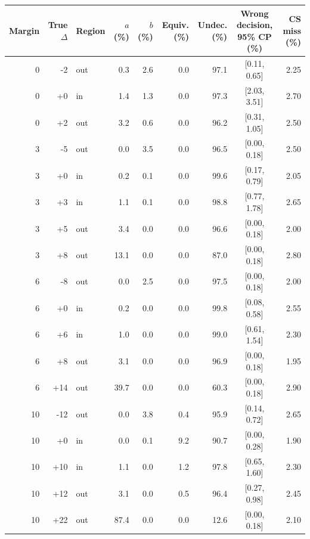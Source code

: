 \begin{tabular}{rrlrrrrcr}
\toprule
Margin & True $\Delta$ & Region & $a$ (\%) & $b$ (\%) & Equiv. (\%) & Undec. (\%) & Wrong decision, 95\% CP (\%) & CS miss (\%) \\
\midrule
0 & -2 & out & 0.3 & 2.6 & 0.0 & 97.1 & [0.11, 0.65] & 2.25 \\
0 & +0 & in & 1.4 & 1.3 & 0.0 & 97.3 & [2.03, 3.51] & 2.70 \\
0 & +2 & out & 3.2 & 0.6 & 0.0 & 96.2 & [0.31, 1.05] & 2.50 \\
3 & -5 & out & 0.0 & 3.5 & 0.0 & 96.5 & [0.00, 0.18] & 2.50 \\
3 & +0 & in & 0.2 & 0.1 & 0.0 & 99.6 & [0.17, 0.79] & 2.05 \\
3 & +3 & in & 1.1 & 0.1 & 0.0 & 98.8 & [0.77, 1.78] & 2.65 \\
3 & +5 & out & 3.4 & 0.0 & 0.0 & 96.6 & [0.00, 0.18] & 2.00 \\
3 & +8 & out & 13.1 & 0.0 & 0.0 & 87.0 & [0.00, 0.18] & 2.80 \\
6 & -8 & out & 0.0 & 2.5 & 0.0 & 97.5 & [0.00, 0.18] & 2.00 \\
6 & +0 & in & 0.2 & 0.0 & 0.0 & 99.8 & [0.08, 0.58] & 2.55 \\
6 & +6 & in & 1.0 & 0.0 & 0.0 & 99.0 & [0.61, 1.54] & 2.30 \\
6 & +8 & out & 3.1 & 0.0 & 0.0 & 96.9 & [0.00, 0.18] & 1.95 \\
6 & +14 & out & 39.7 & 0.0 & 0.0 & 60.3 & [0.00, 0.18] & 2.90 \\
10 & -12 & out & 0.0 & 3.8 & 0.4 & 95.9 & [0.14, 0.72] & 2.65 \\
10 & +0 & in & 0.0 & 0.1 & 9.2 & 90.7 & [0.00, 0.28] & 1.90 \\
10 & +10 & in & 1.1 & 0.0 & 1.2 & 97.8 & [0.65, 1.60] & 2.30 \\
10 & +12 & out & 3.1 & 0.0 & 0.5 & 96.4 & [0.27, 0.98] & 2.45 \\
10 & +22 & out & 87.4 & 0.0 & 0.0 & 12.6 & [0.00, 0.18] & 2.10 \\
\bottomrule
\end{tabular}
